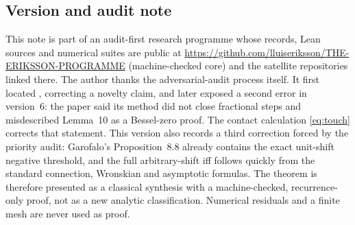\documentclass[11pt]{article}
\theoremstyle{remark}
\begin{document}
\subsection*{Version and audit note}
This note is part of an audit-first research programme whose records,
Lean sources and numerical suites are public at
\url{https://github.com/lluiseriksson/THE-ERIKSSON-PROGRAMME}
(machine-checked core) and the satellite repositories linked there. The author thanks the
adversarial-audit process itself.  It first located
\cite{FreitasLaugesen}, correcting a novelty claim, and later exposed a
second error in version~6: the paper said its method did not close
fractional steps and misdescribed Lemma~10 as a Bessel-zero proof.  The
contact calculation \eqref{eq:touch} corrects that statement.  This
version also records a third correction forced by the priority audit:
Garofalo's Proposition~8.8 already contains the exact unit-shift negative
threshold, and the full arbitrary-shift iff follows quickly from the
standard connection, Wronskian and asymptotic formulas.  The theorem is
therefore presented as a classical synthesis with a machine-checked,
recurrence-only proof, not as a new analytic classification.  Numerical
residuals and a finite mesh are never used as proof.
\end{document}
